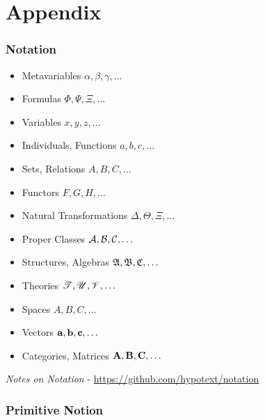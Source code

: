 \part{Appendix}\label{part:appendix}

\section{Notation}\label{sec:notation}

\begin{itemize}
  \item Metavariables $\alpha, \beta, \gamma, \ldots$
  \item Formulas $\Phi, \Psi, \Xi, \ldots$
  \item Variables $x, y, z, \ldots$
  \item Individuals, Functions $a, b, c, \ldots$
  \item Sets, Relations $A, B, C, \ldots$
  \item Functors $F, G, H, \ldots$
  \item Natural Transformations $\Delta, \Theta, \Xi, \ldots$
  \item Proper Classes $\mathcal{A}, \mathcal{B}, \mathcal{C}, \ldots$
  \item Structures, Algebras $\mathfrak{A}, \mathfrak{B},
    \mathfrak{C}, \ldots$
  \item Theories $\mathscr{T}, \mathscr{U}, \mathscr{V}, \ldots$
  \item Spaces $\xspace{A}, \xspace{B}, \xspace{C}, \ldots$
  \item Vectors $\mathbf{a}, \mathbf{b}, \mathbf{c}, \ldots$
  \item Categories, Matrices $\mathbf{A}, \mathbf{B}, \mathbf{C}, \ldots$
\end{itemize}

\fist \emph{Notes on Notation} -  \url{https://github.com/hypotext/notation}



\section{Primitive Notion}\label{sec:primitive_notion}

